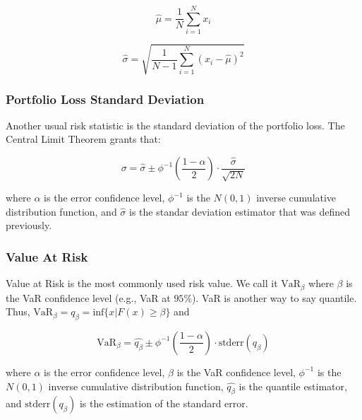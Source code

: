 \documentclass[a4paper,12pt,final]{article}
\begin{document}
\begin{displaymath}
\widehat{\mu} = \frac{1}{N} \sum_{i=1}^{N} x_i
\end{displaymath}

\begin{displaymath}
\widehat{\sigma} =
\sqrt{\frac{1}{N-1} \sum_{i=1}^{N} \left( x_i - \widehat{\mu} \right)^2}
\end{displaymath}

\subsubsection{Portfolio Loss Standard Deviation}
Another usual risk statistic is the standard deviation of the portfolio loss.
The Central Limit Theorem \cite{stats:schaum} grants that:

\begin{displaymath}
\sigma = \widehat{\sigma} \pm \phi^{-1}\left(\frac{1-\alpha}{2}\right) \cdot \frac{\widehat{\sigma}}{\sqrt{2N}}
\end{displaymath}

where $\alpha$ is the error confidence level, $\phi^{-1}$ is the $N(0,1)$ inverse 
cumulative distribution function, and $\widehat{\sigma}$ is the standar deviation 
estimator that was defined previously.

\subsubsection{Value At Risk}
Value at Risk \cite{var:jorion} is the most commonly used risk value. We call it 
$\textrm{VaR}_{\beta}$ where $\beta$ is the VaR confidence level (e.g., VaR at $95\%$).
VaR is another way to say quantile. Thus,
$\textrm{VaR}_{\beta} = q_{\beta} = \textrm{inf}\{x | F(x) \geq \beta \}$ and

\begin{displaymath}
\textrm{VaR}_{\beta} = \widehat{q_{\beta}} \pm \phi^{-1}\left(\frac{1-\alpha}{2}\right) \cdot \textrm{stderr}(q_{\beta})
\end{displaymath}

where $\alpha$ is the error confidence level, $\beta$ is the VaR confidence 
level, $\phi^{-1}$ is the $N(0,1)$ inverse cumulative distribution function, 
$\widehat{q_{\beta}}$ is the quantile estimator, and $\textrm{stderr}(q_{\beta})$
is the estimation of the standard error.
\end{document}
